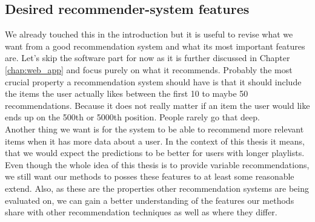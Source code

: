 \subsection{Desired recommender-system features}
We already touched this in the introduction but it is useful to revise what we want from a good recommendation system and what its most important features are. Let's skip the software part for now as it is further discussed in Chapter \ref{chap:web_app} and focus purely on what it recommends. Probably the most crucial property a recommendation system should have is that it should include the items the user actually likes between the first 10 to maybe 50 recommendations. Because it does not really matter if an item the user would like ends up on the 500th or 5000th position. People rarely go that deep. \\
Another thing we want is for the system to be able to recommend more relevant items when it has more data about a user. In the context of this thesis it means, that we would expect the predictions to be better for users with longer playlists. \\
Even though the whole idea of this thesis is to provide variable recommendations, we still want our methods to posses these features to at least some reasonable extend. Also, as these are the properties other recommendation systems are being evaluated on, we can gain a better understanding of the features our methods share with other recommendation techniques as well as where they differ. 

